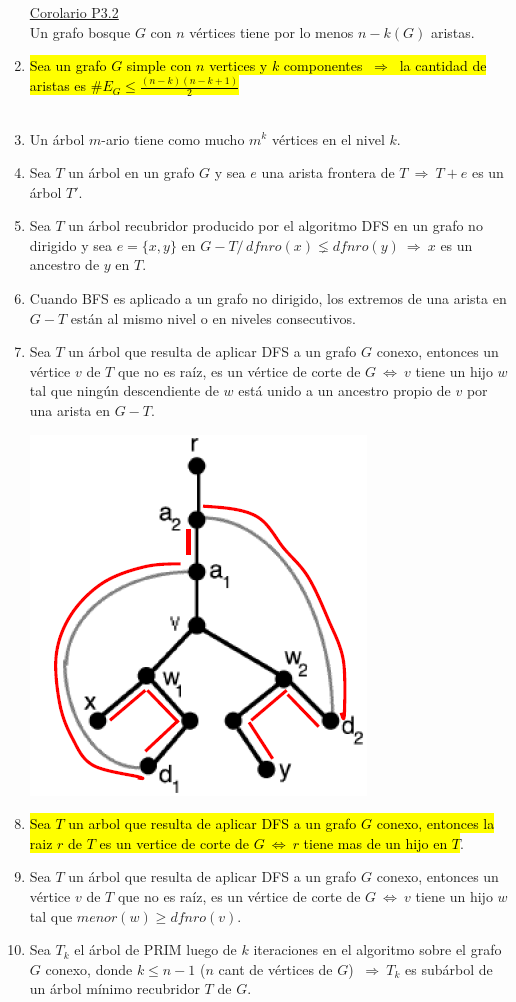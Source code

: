 \documentclass{article}
\newcommand{\tq}{/\,}                                   %
\newcommand{\Rightarrows}{\: \Rightarrow \:}            %
\newcommand{\Leftrightarrows}{\: \Leftrightarrow \:}    %
\begin{document}
\begin{enumerate}
{    {\centering \underline{Corolario P3.2}
    \\Un grafo bosque $G$ con $n$ vértices tiene por lo menos $n-k(G)$ aristas.
    }}
    \item \hl{Sea un grafo $G$ simple con $n$ vertices y $k$ componentes $\Rightarrows$ la cantidad de
aristas es $\# E_G \leq \frac{(n-k)(n-k+1)}{2}$}
    \\\\
    \item Un árbol $m$-ario tiene como mucho $m^k$ vértices en el nivel $k$.
    \item Sea $T$ un árbol en un grafo $G$ y sea $e$ una arista frontera de
$T \Rightarrows T + e$ es un árbol $T'$. 
    \item Sea $T$ un árbol recubridor producido por el algoritmo DFS en un grafo
no dirigido y sea $e=\{ x,y \}$ en $G-T \tq dfnro(x) \lneq dfnro(y) \Rightarrows x$ es un ancestro de $y$
en $T$.
    \item Cuando BFS es aplicado a un grafo no dirigido, los extremos de una
arista en $G-T$ están al mismo nivel o en niveles consecutivos.
    \item Sea $T$ un árbol que resulta de aplicar DFS a un grafo $G$ conexo,
    entonces un vértice $v$ de $T$ que no es raíz, es un vértice de corte de $G \Leftrightarrows v$
tiene un hijo $w$ tal que ningún descendiente de $w$ está unido a un ancestro
propio de $v$ por una arista en $G-T$.
    \begin{center}
        \includegraphics[width=.30\textwidth]{arbolesProp9.PNG}
    \end{center}
    \item \hl{Sea $T$ un arbol que resulta de aplicar DFS a un grafo $G$ conexo, entonces la raiz $r$ de $T$ es un vertice de corte de $G \Leftrightarrows r$ tiene mas de un hijo en $T$}.
    \item Sea $T$ un árbol que resulta de aplicar DFS a un grafo $G$ conexo,
    entonces un vértice $v$ de $T$ que no es raíz, es un vértice de corte de $G \Leftrightarrows v$
tiene un hijo $w$ tal que $menor(w) \geq dfnro(v)$.
    \item Sea $T_k$ el árbol de PRIM luego de $k$ iteraciones en el
algoritmo sobre el grafo $G$ conexo, donde $k \leq n -1$ ($n$ cant de vértices de $G$)
$\Rightarrows T_k$ es subárbol de un árbol mínimo recubridor $T$ de $G$.
\end{enumerate}
\end{document}
